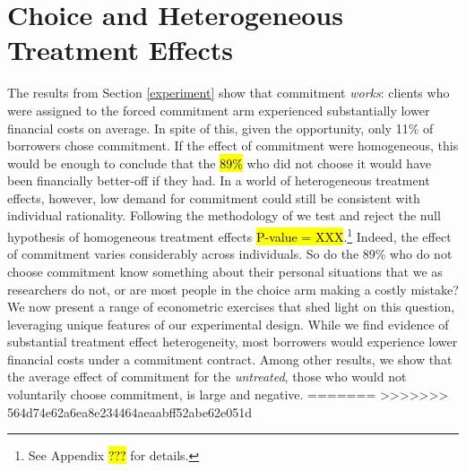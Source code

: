 \documentclass[oneside,11pt]{article}
\begin{document}
\section{Choice and Heterogeneous Treatment Effects}
\label{sec:choice}

The results from Section \ref{experiment} show that commitment \emph{works}: clients who were assigned to the forced commitment arm experienced substantially lower financial costs on average.
In spite of this, given the opportunity, only 11\% of borrowers chose commitment. 
If the effect of commitment were homogeneous, this would be enough to conclude that the \hl{89\%} who did not choose it would have been financially better-off if they had.
In a world of heterogeneous treatment effects, however, low demand for commitment could still be consistent with individual rationality. 
Following the methodology of \cite{chernozhukov2018generic} we test and reject the null hypothesis of homogeneous treatment effects \hl{P-value = XXX}.\footnote{See Appendix \hl{???} for details.} 
Indeed, the effect of commitment varies considerably across individuals. 
So do the 89\% who do not choose commitment know something about their personal situations that we as researchers do not, or are most people in the choice arm making a costly mistake? 
We now present a range of econometric exercises that shed light on this question, leveraging unique features of our experimental design. 
While we find evidence of substantial treatment effect heterogeneity, most borrowers would experience lower financial costs under a commitment contract. 
Among other results, we show that the average effect of commitment for the \emph{untreated}, those who would not voluntarily choose commitment, is large and negative. 
=======
>>>>>>> 564d74e62a6ea8e234464aeaabff52abe62e051d
\end{document}
